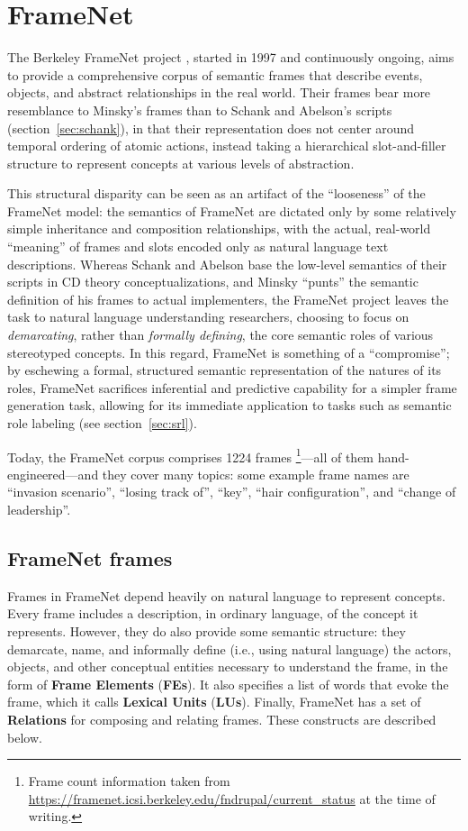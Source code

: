 \section{FrameNet}
\label{sec:framenet}

The Berkeley FrameNet project \citep{framenet}, started in 1997 and continuously ongoing, aims to provide a comprehensive corpus of semantic frames that describe events, objects, and abstract relationships in the real world.
Their frames bear more resemblance to Minsky's frames
than to Schank and Abelson's scripts (section~\ref{sec:schank}), in that their representation does not center around temporal ordering of atomic actions, instead taking a hierarchical slot-and-filler structure to represent concepts at various levels of abstraction.

This structural disparity can be seen as an artifact of the ``looseness'' of the FrameNet model: the semantics of FrameNet are dictated only by some relatively simple inheritance and composition relationships, with the actual, real-world ``meaning'' of frames and slots encoded only as natural language text descriptions. Whereas Schank and Abelson base the low-level semantics of their scripts in CD theory conceptualizations, and Minsky ``punts'' the semantic definition of his frames to actual implementers, the FrameNet project leaves the task to natural language understanding researchers, choosing to focus on \textit{demarcating}, rather than \textit{formally defining}, the core semantic roles of various stereotyped concepts. In this regard, FrameNet is something of a ``compromise''; by eschewing a formal, structured semantic representation of the natures of its roles, FrameNet sacrifices inferential and predictive capability for a simpler frame generation task, allowing for its immediate application to tasks such as semantic role labeling (see section~\ref{sec:srl}).

Today, the FrameNet corpus comprises 1224 frames \footnote{Frame count information taken from \url{https://framenet.icsi.berkeley.edu/fndrupal/current_status} at the time of writing.}---all of them hand-engineered---and they cover many topics: some example frame names are ``invasion scenario'', ``losing track of'', ``key'', ``hair configuration'', and ``change of leadership''.

\subsection{FrameNet frames}
Frames in FrameNet depend heavily on natural language to represent concepts. Every frame includes a description, in ordinary language, of the concept it represents. However, they do also provide some semantic structure: they demarcate, name, and informally define (i.e., using natural language) the actors, objects, and other conceptual entities necessary to understand the frame, in the form of \textbf{Frame Elements} (\textbf{FEs}). It also specifies a list of words that evoke the frame, which it calls \textbf{Lexical Units} (\textbf{LUs}). Finally, FrameNet has a set of \textbf{Relations} for composing and relating frames. These constructs are described below.

